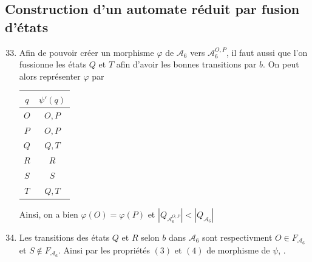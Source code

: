 \documentclass{article}
\begin{document}
\subsection{Construction d'un automate r\'eduit par fusion d'\'etats}

\begin{enumerate}
    \setcounter{enumi}{32}

    \item \begin{minipage}[t]{\linewidth}
        \centering
        \label{fig:fig3}
        \end{minipage}
    
    Afin de pouvoir créer un morphisme $\varphi$ de $\mathcal{A}_6$ vers $\mathcal{A}_6^{O, P}$, il faut aussi que l'on fussionne les états $Q$ et $T$ afin d'avoir les bonnes transitions par $b$. On peut alors représenter $\varphi$ par \begin{tabular}{|c|c|}
        \hline
        $q$ & $\psi'(q)$ \\
        \hline
        $O$ & $O, P$ \\
        \hline
        $P$ & $O, P$ \\
        \hline
        $Q$ & $Q, T$ \\
        \hline
        $R$ & $R$ \\
        \hline
        $S$ & $S$ \\
        \hline
        $T$ & $Q, T$ \\
        \hline
    \end{tabular}
    Ainsi, on a bien $\varphi(O) = \varphi(P)$ et $|Q_{\mathcal{A}_6^{O, P}}| < |Q_{\mathcal{A}_6}|$

    \item Les transitions des états $Q$ et $R$ selon $b$ dans $\mathcal{A}_6$ sont respectivment $O \in F_{\mathcal{A}_6}$ et $S \notin F_{\mathcal{A}_6}$. Ainsi par les propriétés $(3)$ et $(4)$ de morphisme de $\psi$, .


\end{enumerate}
\end{document}
